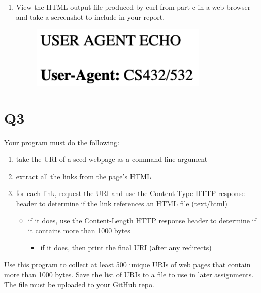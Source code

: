 \documentclass[12pt]{article}
\begin{document}
\begin{enumerate}
    \item View the HTML output file produced by curl from part c in a web browser and take a screenshot to include in your report.
    \begin{figure}[h!]
        \centering
        \includegraphics[width=0.8\textwidth] {output.jpg}
        \label{fig:q2-d}
    \end{figure}
    
\end{enumerate}

\clearpage

\section*{Q3}

Your program must do the following:
\begin{enumerate}
    \item take the URI of a seed webpage as a command-line argument
    \item extract all the links from the page's HTML
    \item for each link, request the URI and use the Content-Type HTTP response header to determine if the link references an HTML file (text/html)
    \begin{itemize}
        \item if it does, use the Content-Length HTTP response header to determine if it contains more than 1000 bytes
        \begin{itemize}
            \item if it does, then print the final URI (after any redirects)
        \end{itemize}
    \end{itemize}
\end{enumerate}

Use this program to collect at least 500 unique URIs of web pages that contain more than 1000 bytes. Save the list of URIs to a file to use in later assignments. The file must be uploaded to your GitHub repo.
\end{document}
